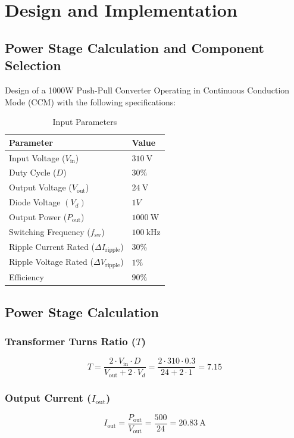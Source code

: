 \section{Design and Implementation}
\subsection{Power Stage Calculation and Component Selection}
Design of a 1000W Push-Pull Converter Operating in Continuous Conduction Mode (CCM) with
the following specifications:
\begin{table}[h!]
    \centering
    \begin{tabular}{ll}
        \toprule
        \textbf{Parameter} & \textbf{Value} \\
        \midrule
        Input Voltage ($V_{\text{in}}$) & $\SI{310}{\volt}$ \\
        Duty Cycle ($D$) & $30\% $ \\
        Output Voltage ($V_{\text{out}}$) & $\SI{24}{\volt}$ \\
        Diode Voltage $(V_d)$ & $1V$\\
        Output Power ($P_{\text{out}}$) & $\SI{1000}{\watt}$ \\
        Switching Frequency ($f_{\text{sw}}$) & $\SI{100}{\kilo\hertz}$ \\
        Ripple Current Rated ($\Delta I_{\text{ripple}}$) & $30\%$ \\
        Ripple Voltage Rated ($\Delta V_{\text{ripple}}$) & $1\%$ \\
        Efficiency & $90\%$ \\
        \bottomrule
    \end{tabular}
    \caption{Input Parameters}
    \label{tab:system_parameters}
\end{table}
\subsection{Power Stage Calculation}

\subsubsection*{Transformer Turns Ratio (\(T\))}
\begin{equation}
T = \frac{2 \cdot V_{\text{in}} \cdot D}{V_{\text{out}} + 2 \cdot V_d} = \frac{2 \cdot 310 \cdot 0.3}{24 + 2 \cdot 1} = \boxed{7.15}
\end{equation}

\subsubsection*{Output Current (\(I_{\text{out}}\))}
\begin{equation}
I_{\text{out}} = \frac{P_{\text{out}}}{V_{\text{out}}} = \frac{500}{24} = \boxed{\SI{20.83}{\ampere}}
\end{equation}

